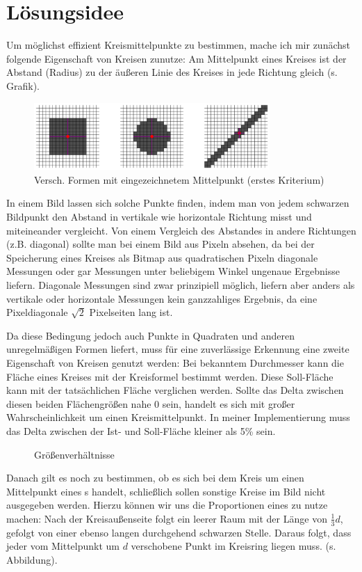 \section{Lösungsidee}
Um möglichst effizient Kreismittelpunkte zu bestimmen, mache ich mir zunächst folgende Eigenschaft von Kreisen zunutze: Am Mittelpunkt eines Kreises ist der Abstand (Radius) zu der äußeren Linie des Kreises in jede Richtung gleich (s. Grafik).

\begin{figure}[!ht]
	\centering	
	\includegraphics[width=0.8\textwidth]{durchmesservergleich}
	\caption{Versch. Formen mit eingezeichnetem Mittelpunkt (erstes Kriterium)}
\end{figure}

In einem Bild lassen sich solche Punkte finden, indem man von jedem schwarzen Bildpunkt den Abstand in vertikale wie horizontale Richtung misst und miteineander vergleicht. Von einem Vergleich des Abstandes in andere Richtungen (z.B. diagonal) sollte man bei einem Bild aus Pixeln absehen, da bei der Speicherung eines Kreises als Bitmap aus quadratischen Pixeln diagonale Messungen oder gar Messungen unter beliebigem Winkel ungenaue Ergebnisse liefern. Diagonale Messungen sind zwar prinzipiell möglich, liefern aber anders als vertikale oder horizontale Messungen kein ganzzahliges Ergebnis, da eine Pixeldiagonale \(\sqrt{2}\) Pixelseiten lang ist.

Da diese Bedingung jedoch auch Punkte in Quadraten und anderen unregelmäßigen Formen liefert, muss für eine zuverlässige Erkennung eine zweite Eigenschaft von Kreisen genutzt werden: Bei bekanntem Durchmesser kann die Fläche eines Kreises mit der Kreisformel bestimmt werden. Diese Soll-Fläche kann mit der tatsächlichen Fläche verglichen werden. Sollte das Delta zwischen diesen beiden Flächengrößen nahe 0 sein, handelt es sich mit großer Wahrscheinlichkeit um einen Kreismittelpunkt. In meiner Implementierung muss das Delta zwischen der Ist- und Soll-Fläche kleiner als 5\% sein.

\begin{figure}
  \centering
  
  \caption{Größenverhältnisse}
\end{figure}
Danach gilt es noch zu bestimmen, ob es sich bei dem Kreis um einen Mittelpunkt eines \task{}s handelt, schließlich sollen sonstige Kreise im Bild nicht ausgegeben werden. Hierzu können wir uns die Proportionen eines  zu nutze machen: Nach der Kreisaußenseite folgt ein leerer Raum mit der Länge von \(\frac{1}{3}d\), gefolgt von einer ebenso langen durchgehend schwarzen Stelle. Daraus folgt, dass jeder vom Mittelpunkt um \(d\) verschobene Punkt im Kreisring liegen muss. (s. Abbildung).

